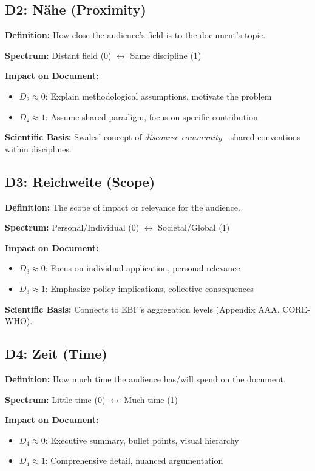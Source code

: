 \subsection{D2: N\"ahe (Proximity)}

\textbf{Definition:} How close the audience's field is to the document's topic.

\textbf{Spectrum:} Distant field (0) $\leftrightarrow$ Same discipline (1)

\textbf{Impact on Document:}
\begin{itemize}[nosep]
\item $D_2 \approx 0$: Explain methodological assumptions, motivate the problem
\item $D_2 \approx 1$: Assume shared paradigm, focus on specific contribution
\end{itemize}

\textbf{Scientific Basis:} Swales' \citeyearpar{swales1990} concept of
\textit{discourse community}---shared conventions within disciplines.

\subsection{D3: Reichweite (Scope)}

\textbf{Definition:} The scope of impact or relevance for the audience.

\textbf{Spectrum:} Personal/Individual (0) $\leftrightarrow$ Societal/Global (1)

\textbf{Impact on Document:}
\begin{itemize}[nosep]
\item $D_3 \approx 0$: Focus on individual application, personal relevance
\item $D_3 \approx 1$: Emphasize policy implications, collective consequences
\end{itemize}

\textbf{Scientific Basis:} Connects to EBF's aggregation levels
(Appendix AAA, CORE-WHO).

\subsection{D4: Zeit (Time)}

\textbf{Definition:} How much time the audience has/will spend on the document.

\textbf{Spectrum:} Little time (0) $\leftrightarrow$ Much time (1)

\textbf{Impact on Document:}
\begin{itemize}[nosep]
\item $D_4 \approx 0$: Executive summary, bullet points, visual hierarchy
\item $D_4 \approx 1$: Comprehensive detail, nuanced argumentation
\end{itemize}

